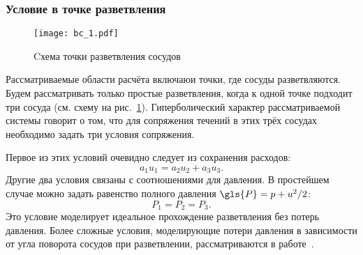 \subsubsection{Условие в точке разветвления}
\begin{figure}[h!]
\centering
\texttt{[image: bc\_1.pdf]}
\caption{Cхема точки разветвления сосудов}\label{fig:bc_1}
\end{figure}

Рассматриваемые области расчёта включаюи точки,
где сосуды разветвляются. Будем рассматривать только простые разветвления,
когда к одной точке подходит три сосуда (см. схему на рис.~\ref{fig:bc_1}).
Гиперболический характер рассматриваемой системы говорит о том,
что для сопряжения течений в этих трёх сосудах необходимо задать три условия сопряжения.

Первое из этих условий очевидно следует из сохранения расходов:
\begin{equation}
\label{eq:q_conservation}
a_1 u_1 = a_2 u_2 + a_3 u_3.
\end{equation}
Другие два условия связаны с соотношениями для давления. В простейшем случае можно задать равенство
полного давления $\gls{P} = p + u^2/2$:
\begin{equation}
\label{eq:p_total_conservation}
P_1 = P_2 = P_3.
\end{equation}
Это условие моделирует идеальное прохождение разветвления без потерь давления.
Более сложные условия, моделирующие потери давления в зависимости от угла поворота
сосудов при разветвлении, рассматриваются в работе~\cite{Formaggia2003}.
